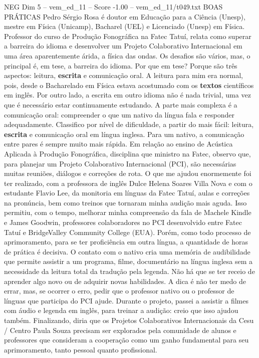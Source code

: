 \begin{textsample}{NEG Dim 5 – vem\_ed\_11 – Score -1.00 – vem\_ed\_11/t049.txt}  \label{ex:f5_neg_056}
BOAS PRÁTICAS Pedro Sérgio Rosa é doutor em Educação para a Ciência (Unesp), mestre em Física (Unicamp), Bacharel (UEL) e Licenciado (Unesp) em Física.
Professor do curso de Produção Fonográfica na Fatec Tatuí, relata como superar a barreira do idioma e desenvolver um Projeto Colaborativo Internacional em uma área aparentemente árida, a física das ondas.
Os desafios são vários, mas, o principal é, em tese, a barreira do idioma.
Por que em tese?
Porque são três aspectos: leitura, \textbf{escrita} e comunicação oral.
A leitura para mim era normal, pois, desde o Bacharelado em Física estava acostumado com os \textbf{textos} científicos em inglês.
Por outro lado, a escrita em outro idioma não é nada trivial, uma vez que é necessário estar continuamente estudando.
A parte mais complexa é a comunicação oral: compreender o que um nativo da língua fala e responder adequadamente.
Classifico por nível de dificuldade, a partir do mais fácil: leitura, \textbf{escrita} e comunicação oral em língua inglesa.
Para um nativo, a comunicação entre pares é sempre muito mais rápida.
Em relação ao ensino de Acústica Aplicada à Produção Fonográfica, disciplina que ministro na Fatec, observo que, para planejar um Projeto Colaborativo Internacional (PCI), são necessárias muitas reuniões, diálogos e correções de rota.
O que me ajudou enormemente foi ter realizado, com a professora de inglês Dulce Helena Soares Villa Nova e com o estudante Flavio Lee, da monitoria em línguas da Fatec Tatuí, aulas e correções na pronúncia, bem como treinos que tornaram minha audição mais aguda.
Isso permitiu, com o tempo, melhorar minha compreensão da fala de Machele Kindle e James Goodwin, professores colaboradores no PCI desenvolvido entre Fatec Tatuí e BridgeValley Community College (EUA).
Porém, como todo processo de aprimoramento, para se ter proficiência em outra língua, a quantidade de horas de prática é decisiva.
O contato com o nativo cria uma memória de audibilidade que permite assistir a um programa, filme, documentário na língua inglesa sem a necessidade da leitura total da tradução pela legenda.
Não há que se ter receio de aprender algo novo ou de adquirir novas habilidades.
A dica é não ter medo de errar, mas, se ocorrer o erro, pedir que o professor nativo ou o professor de línguas que participa do PCI ajude.
Durante o projeto, passei a assistir a filmes com áudio e legenda em inglês, para treinar a audição: creio que isso ajudou também.
Finalizando, diria que os Projetos Colaborativos Internacionais da Cesu / Centro Paula Souza precisam ser explorados pela comunidade de alunos e professores que consideram a cooperação como um ganho fundamental para seu aprimoramento, tanto pessoal quanto profissional.

\end{textsample}
